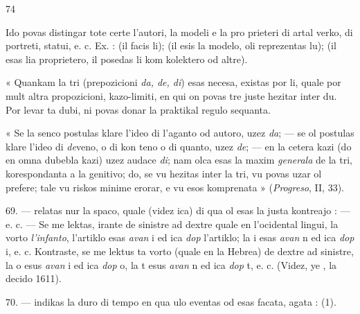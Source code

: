 \begin{VUpage}[78]{74}

Ido povas distingar tote certe l'autori, la modeli e la pro\cc
prieteri di artal verko, di portreti, statui, e. c. Ex. : \cc
{} (il facis li);  (il esis\nl
la modelo, oli reprezentas lu);  (il\nl
esas lia proprietero, il posedas li kom kolektero od altre).

« Quankam la tri (prepozicioni \textit{da, de, di}) esas necesa,\nl
existas por li, quale por mult altra propozicioni, kazo-limiti,\nl
en qui on povas tre juste hezitar inter du. Por levar ta dubi,\nl
ni povas donar la praktikal regulo sequanta.

« Se la senco postulas klare l'ideo di l'aganto od autoro,\nl
uzez \textit{da}; --- se ol postulas klare l'ideo di \textit{de}veno, o di kon\cc
teno o di quanto, uzez \textit{de}; --- en la cetera kazi (do en omna\nl
dubebla kazi) uzez audace \textit{di}; nam olca esas la maxim\nl
\textit{generala} de la tri, korespondanta a la genitivo; do, se vu\nl
hezitas inter la tri, vu povas uzar ol prefere; tale vu riskos\nl
minime erorar, e vu esos komprenata » (\textit{Progreso}, II, 33).

\VUblanc{3.70pt}%
69. ---  relatas nur la spaco, quale  (videz ica)\nl
di qua ol esas la justa kontreajo : \nl
{}\nl
{}\nl
{} --- \nl
{}\nl
{}\nl
{} e. c. --- Se me lektas, irante de sinistre ad dextre\nl
quale en l'ocidental lingui, la vorto \textit{l'infanto}, l'artiklo esas\nl
\textit{avan} i ed ica \textit{dop} l'artiklo; la i esas \textit{avan} n ed ica \textit{dop} i, e. c.\nl
Kontraste, se me lektus ta vorto (quale en la Hebrea) de\nl
dextre ad sinistre, la o esus \textit{avan} i ed ica \textit{dop} o, la t esus\nl
\textit{avan} n ed ica \textit{dop} t, e. c. (Videz, ye , la decido 1611).

\VUblanc{3.85pt}%
70. ---  indikas la duro di tempo en qua ulo eventas\nl
od esas facata, agata : \nl
{}\nl
{} (1).
\end{VUpage}

